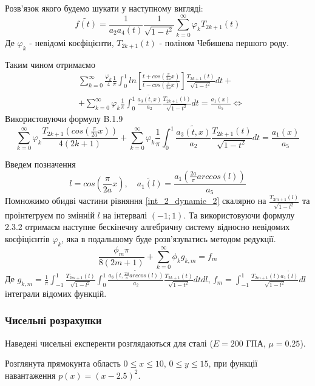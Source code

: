 Розв'язок якого будемо шукати у наступному вигляді:
\begin{equation}
    \widetilde{f(t)} = \frac{1}{a_2 a_4(t)} \frac{1}{\sqrt{1 - t^2}} \sum_{k=0}^{\infty} \varphi_k T_{2k + 1}(t) 
\end{equation}
Де $\varphi_k$ - невідомі коєфіцієнти, $T_{2k + 1}(t)$ - поліном Чебишева першого роду.

Таким чином отримаємо
\begin{align*}
    & \sum_{k=0}^{\infty}  \frac{\varphi_k}{4} \frac{1}{\pi} \int_{0}^{1} ln\left[ \frac{t + cos(\frac{\pi}{2a}x)}{t - cos(\frac{\pi}{2a}x)} \right] \frac{T_{2k + 1}(t)}{\sqrt{1 - t^2}} dt + \\
    & + \sum_{k=0}^{\infty} \varphi_k \frac{1}{\pi} \int_{0}^{1} \frac{\widetilde{a_3(t, x)}}{a_2} \frac{T_{2k + 1}(t)}{\sqrt{1 - t^2}} dt = \frac{a_1(x)}{a_5} \Leftrightarrow
\end{align*}
Використовуючи формулу B.1.9 \cite{ortogonal}
\begin{equation}\label{int_2_dynamic_2}
    \sum_{k=0}^{\infty}  \varphi_k \frac{T_{2k + 1}( cos(\frac{\pi}{2a}x) )}{4(2k + 1)} + \sum_{k=0}^{\infty} \varphi_k \frac{1}{\pi} \int_{0}^{1} \frac{\widetilde{a_3(t, x)}}{a_2} \frac{T_{2k + 1}(t)}{\sqrt{1 - t^2}} dt = \frac{a_1(x)}{a_5}
\end{equation}

Введем позначення
\begin{equation*}
    l = cos(\frac{\pi}{2a}x), \quad \widetilde{a_1(l)} = \frac{a_1(\frac{2a}{\pi} arccos(l))}{a_5}
\end{equation*}
Помножимо обидві частини рівняння \eqref{int_2_dynamic_2} скалярно на $\frac{T_{2m + 1}(l)}{\sqrt{1 - l^2}}$ та проінтегруєм по змінній $l$ на інтервалі $(-1; 1)$.
Та використовуючи формулу 2.3.2 \cite{ortogonal} отримаєм наступне бескінечну алгебричну систему відносно невідомих коєфіцієнтів $\varphi_k$, яка в подальшому буде розв'язуватись методом редукції.
\begin{equation}\label{int_system_dynamic_2}
    \frac{\phi_m \pi}{8(2m + 1)} + \sum_{k=0}^{\infty} \phi_k g_{k, m} = f_m
\end{equation}
Де $g_{k, m} = \frac{1}{\pi} \int_{-1}^{1} \frac{T_{2m + 1}(l)}{\sqrt{1 - l^2}} \int_{0}^{1} \frac{\widetilde{a_3(t, \frac{2a}{\pi} arccos(l) )}}{a_2} \frac{T_{2k + 1}(t)}{\sqrt{1 - t^2}} dt dl$,
$f_m = \int_{-1}^{1} \frac{T_{2m + 1}(l) \widetilde{a_1(l)}}{\sqrt{1 - l^2}} dl$ інтеграли відомих функцій.

\subsubsection{Чисельні розрахунки}
Наведені чисельні експеренти розглядаються для сталі ($E=200$ ГПА, $\mu=0.25$).

Розглянута прямокунта область $0 \le x \le 10$, $0 \le y \le 15$, при функції навантаження $p(x)=(x-2.5)^2$.
